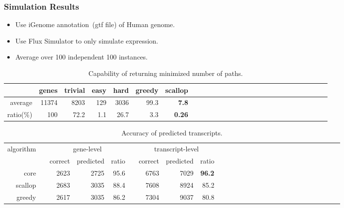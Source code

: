 \frame
{
	\frametitle{Simulation Results}

	\begin{itemize}
	\item Use iGenome annotation~(gtf file) of Human genome.
	\item Use Flux Simulator to only simulate expression.
	\item Average over 100 independent 100 instances.
	\end{itemize}

	\vspace{0.2cm}
	\def\SA{\hspace*{0pt}}
	\def\SC{\hspace*{-2pt}}
	\def\SB{\hspace*{1pt}}
	\def\SD{\hspace*{3pt}}

	\begin{table}
	\begin{center}%
		\setlength{\tabcolsep}{6.47pt}%
		\begin{tabular}{rrrrrrrrrrrrrrrrrrrrrrrrrrr}%
		\hline
		     & genes & trivial & easy & hard & greedy & scallop \\
		\hline
		average & 11374 & 8203 & 129 & 3036 & 99.3 & {\bf 7.8} \\
		\hline
		ratio(\%)  & 100 & 72.2  & 1.1 & 26.7 & 3.3 & {\bf 0.26} \\
		\hline
		\end{tabular}%
	\end{center}%
	\caption{Capability of returning minimized number of paths.}
	\end{table}

	\vspace{-0.2cm}
	\begin{table}
	\begin{center}%
		\setlength{\tabcolsep}{2.8pt}%
		\begin{tabular}{rrrrrrrrrrrrrrrrrrrrrrrrrrr}%
		\hline
		\multirow{2}{*}{algorithm} &\SB& \multicolumn{3}{c}{gene-level} &\SD& \multicolumn{3}{c}{transcript-level}\\
		\cline{3-5} \cline{7-9}
		     && correct & predicted & ratio && correct & predicted & ratio\\
		\hline
		core    && 2623 & 2725 & 95.6 && 6763 & 7029 & {\bf 96.2} \\
		scallop && 2683 & 3035 & 88.4 && 7608 & 8924 & 85.2 \\
		greedy  && 2617 & 3035 & 86.2 && 7304 & 9037 & 80.8 \\
		\hline
		\end{tabular}%
	\end{center}%
	\caption{Accuracy of predicted transcripts.}
	\end{table}

}

